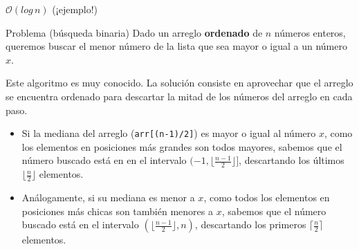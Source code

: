 \documentclass{beamer}
\begin{document}
    \begin{frame}{$\mathcal{O}(log \, n)$ (¡ejemplo!)}
        \begin{block}{Problema (búsqueda binaria)} 
            \pause
            Dado un arreglo \textbf{ordenado} de $n$ números enteros, queremos buscar el menor número de la lista que sea mayor o igual a un número $x$.
        \end{block} \pause
        Este algoritmo es muy conocido. La solución consiste en aprovechar que el arreglo se encuentra ordenado para descartar la mitad de los números del arreglo en cada paso. \pause 

        \begin{itemize}

            \item Si la mediana del arreglo (\texttt{arr[(n-1)/2]}) es mayor o igual al número $x$, como los elementos en posiciones más grandes son todos mayores, sabemos que el número buscado está en en el intervalo $(-1, \lfloor\frac{n-1}{2}\rfloor]$, descartando los últimos $\lfloor\frac{n}{2}\rfloor$ elementos. \pause 

            \item Análogamente, si su mediana es menor a $x$, como todos los elementos en posiciones más chicas son también menores a $x$, sabemos que el número buscado está en el intervalo $(\lfloor \frac{n-1}{2} \rfloor, n)$, descartando los primeros $\lceil\frac{n}{2}\rceil$ elementos.
        \end{itemize}
    \end{frame}
    
\end{document}
